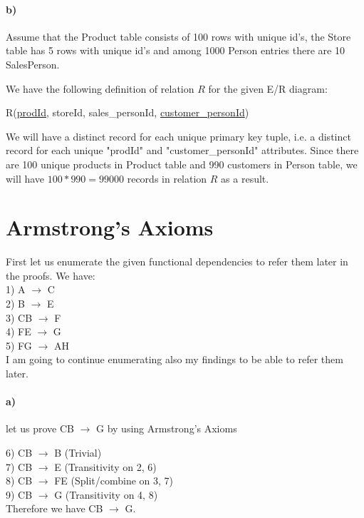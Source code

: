 \documentclass[a4paper,12pt]{article}
\begin{document}
\paragraph{b)}Assume that the Product table consists of 100 rows with unique id’s, the Store table has 5 rows with unique id’s and among 1000 Person entries there are 10 SalesPerson. \\

\begin{tcolorbox}
We have the following definition of relation $R$ for the given E/R diagram:
\begin{center}
    R(\underline{prodId}, storeId, sales\_personId, \underline{customer\_personId})
\end{center}
We will have a distinct record for each unique primary key tuple, i.e. a distinct record for each unique "prodId" and "customer\_personId" attributes. Since there are 100 unique products in Product table and 990 customers in Person table, we will have $100 * 990 = 99000$ records in relation $R$ as a result.
\end{tcolorbox}

\section{Armstrong’s Axioms}

First let us enumerate the given functional dependencies to refer them later in the proofs. We have: \\
1) A $\rightarrow$ C \\
2) B $\rightarrow$ E \\
3) CB $\rightarrow$ F \\
4) FE $\rightarrow$ G \\
5) FG $\rightarrow$ AH \\

I am going to continue enumerating also my findings to be able to refer them later.

\paragraph{a)} let us prove CB $\rightarrow$ G by using Armstrong's Axioms \\

\begin{tcolorbox}
6) CB $\rightarrow$ B (Trivial) \\
7) CB $\rightarrow$ E (Transitivity on 2, 6) \\
8) CB $\rightarrow$ FE (Split/combine on 3, 7) \\
9) CB $\rightarrow$ G (Transitivity on 4, 8) \\ 
Therefore we have CB $\rightarrow$ G.
\end{tcolorbox}
\end{document}
